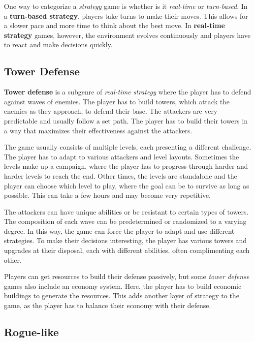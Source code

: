 One way to categorize a \emph{strategy} game is whether is it \emph{real-time} or \emph{turn-based}.
In a \textbf{turn-based strategy}, players take turns to make their moves.
This allows for a slower pace and more time to think about the best move.
In \textbf{real-time strategy} games, however, the environment evolves continuously and players have to react and make decisions quickly.

\subsection{Tower Defense}

\textbf{Tower defense} is a subgenre of \emph{real-time strategy} where the player has to defend against waves of enemies.
The player has to build towers, which attack the enemies as they approach, to defend their base.
The attackers are very predictable and usually follow a set path.
The player has to build their towers in a way that maximizes their effectiveness against the attackers.

The game usually consists of multiple levels, each presenting a different challenge.
The player has to adapt to various attackers and level layouts.
Sometimes the levels make up a campaign, where the player has to progress through harder and harder levels to reach the end.
Other times, the levels are standalone and the player can choose which level to play, where the goal can be to survive as long as possible.
This can take a few hours and may become very repetitive.

The attackers can have unique abilities or be resistant to certain types of towers.
The composition of each wave can be predetermined or randomized to a varying degree.
In this way, the game can force the player to adapt and use different strategies.
To make their decisions interesting, the player has various towers and upgrades at their disposal, each with different abilities, often complimenting each other.

Players can get resources to build their defense passively, but some \emph{tower defense} games also include an economy system.
Here, the player has to build economic buildings to generate the resources.
This adds another layer of strategy to the game, as the player has to balance their economy with their defense.

\subsection{Rogue-like}

